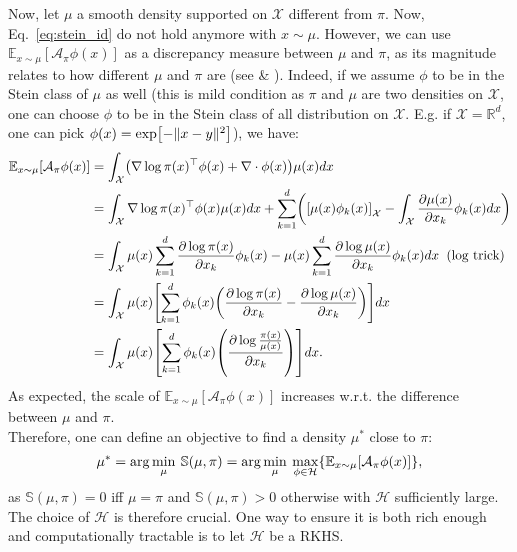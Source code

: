 \documentclass[runningheads,a4paper]{llncs}
\newcommand{\R}{\mathbb{R}}
\newcommand{\E}{\mathbb{E}}
\newcommand{\Sr}{\mathbb{S}}
\newcommand{\X}{\mathcal{X}}
\newcommand{\A}{\mathcal{A}}
\newcommand{\Hr}{\mathcal{H}}
\newcommand{\diff}[2]{\frac{\partial #1}{\partial #2}}
\DeclarePairedDelimiter{\pare}{(}{)}
\DeclarePairedDelimiter{\bra}{\{}{\}}
\DeclarePairedDelimiter{\sq}{[}{]}
\begin{document}
Now, let $\mu$ a smooth density supported on $\X$ different from $\pi$. Now, Eq.~\ref{eq:stein_id} do not hold
anymore with $x \sim \mu$. However, we can use $\E_{x \sim \mu}[\A_\pi \phi (x)]$ as a discrepancy
measure between $\mu$ and $\pi$, as its magnitude relates to how different $\mu$ and $\pi$ are
(see \cite{https://doi.org/10.48550/arxiv.1608.04471} \& \cite{https://doi.org/10.48550/arxiv.1704.07520}).
Indeed, if we assume $\phi$ to be in the Stein class of $\mu$ as well (this is mild condition as
$\pi$ and $\mu$ are two densities on $\X$, one can choose $\phi$ to be in the Stein class
of all distribution on $\X$. E.g. if $\X = \R^d$, one can pick $\phi(x) = \exp\sq*{-\| x - y \|^2}$),
we have:
\begin{equation}
  \begin{split}
    \E_{x \sim \mu}[\A_\pi \phi (x)] &=
      \int_\X \pare*{ \nabla \log \pi(x)^\top \phi(x) + \nabla \cdot \phi(x) } \mu(x) dx \\
    &= \int_\X \nabla \log \pi(x)^\top \phi(x) \mu(x) dx +
    \sum_{k=1}^d \pare*{ \sq*{\mu(x) \phi_k(x)}_\X - \int_\X \diff{\mu(x)}{x_k} \phi_k(x) dx} \\
    &= \int_\X  \mu(x) \sum_{k=1}^d \diff{\log \pi(x)}{x_k}\phi_k(x) -
    \mu(x) \sum_{k=1}^d \diff{\log \mu(x)}{x_k} \phi_k(x) dx \;\; \text{(log trick)} \\
    &= \int_\X  \mu(x) \sq*{ \sum_{k=1}^d \phi_k(x) \pare*{ \diff{\log \pi(x)}{x_k} - \diff{\log \mu(x)}{x_k}}} dx \\
    &= \int_\X  \mu(x) \sq*{ \sum_{k=1}^d \phi_k(x) \pare*{ \diff{\log \frac{\pi(x)}{\mu(x)}}{x_k}}} dx.
  \end{split}
\end{equation}
As expected, the scale of $\E_{x \sim \mu}[\A_\pi \phi (x)]$ increases w.r.t. the difference between $\mu$ and $\pi$.\\

Therefore, one can define an objective to find a density $\mu^*$ close to $\pi$:
\begin{equation}
  \mu^* = \arg\min_{\mu} \: \Sr(\mu, \pi) =
    \arg\min_{\mu} \: \max_{\phi \in \Hr} \bra*{ \E_{x \sim \mu}[\A_\pi \phi (x)] },
  \label{eq:stein_obj}
\end{equation}
as $\Sr(\mu, \pi) = 0$ iff $\mu = \pi$ and $\Sr(\mu, \pi) > 0$ otherwise with $\Hr$ sufficiently large.
The choice of $\Hr$ is therefore crucial. One way to ensure it is both rich enough and computationally tractable
is to let $\Hr$ be a RKHS.
\end{document}
